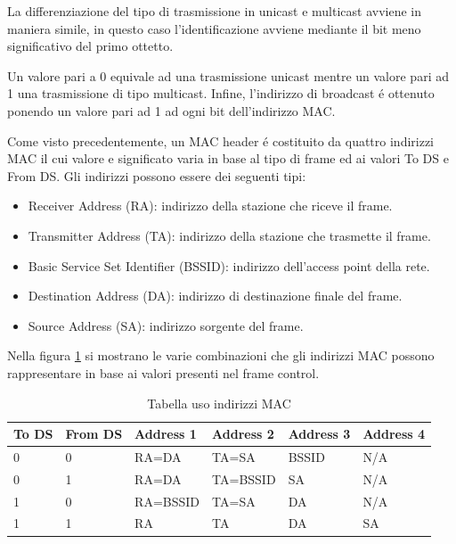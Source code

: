 La differenziazione del tipo di trasmissione in unicast e multicast avviene in maniera simile, in questo caso l'identificazione avviene mediante il bit meno significativo del primo ottetto.

Un valore pari a 0 equivale ad una trasmissione unicast mentre un valore pari ad 1 una trasmissione di tipo multicast.
Infine, l'indirizzo di broadcast \'e ottenuto ponendo un valore pari ad 1 ad ogni bit dell'indirizzo MAC.

Come visto precedentemente, un MAC header \'e costituito da quattro indirizzi MAC il cui valore e significato varia in base al tipo di frame ed ai valori To DS e From DS.
Gli indirizzi possono essere dei seguenti tipi:
\begin{itemize}
	\item Receiver Address (RA): indirizzo della stazione che riceve il frame.
	\item Transmitter Address (TA): indirizzo della stazione che trasmette il frame.
	\item Basic Service Set Identifier (BSSID): indirizzo dell'access point della rete.
	\item Destination Address (DA): indirizzo di destinazione finale del frame.
	\item Source Address (SA): indirizzo sorgente del frame.
\end{itemize}

Nella figura \ref{table:addressvalue} si mostrano le varie combinazioni che gli indirizzi MAC possono rappresentare in base ai valori presenti nel frame control.

\begin{table}[h]
\centering
\begin{tabular}{| l | l | l | l | l | l |}
	\hline 
	To DS  & From DS & Address 1 & Address 2 & Address 3 & Address 4\\ \hline
	 0 & 0 & RA=DA & TA=SA & BSSID & N/A \\ \hline
     0 & 1 & RA=DA & TA=BSSID & SA & N/A\\ \hline
	 1 & 0 & RA=BSSID & TA=SA & DA & N/A\\ \hline
	 1 & 1 & RA & TA & DA & SA\\ \hline
\end{tabular}
\centering
\caption{Tabella uso indirizzi MAC }
\label{table:addressvalue}
\end{table}



